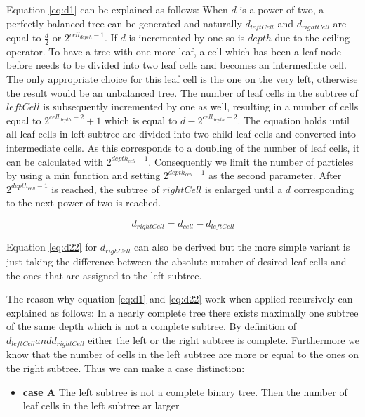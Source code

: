 \documentclass[]{article}
\begin{document}
Equation \ref{eq:d1} can be explained as follows: When $d$ is a power of two, a perfectly balanced tree can be generated and naturally $d_{leftCell}$ and $d_{rightCell}$ are equal to $\frac{d}{2}$ or $2^{cell_{depth} - 1}$. If $d$ is incremented by one so is $depth$ due to the ceiling operator. To have a tree with one more leaf, a cell which has been a leaf node before needs to be divided into two leaf cells and becomes an intermediate cell. The only appropriate choice for this leaf cell is the one on the very left, otherwise the result would be an unbalanced tree.
The number of leaf cells in the subtree of $leftCell$ is subsequently incremented by one as well, resulting in a number of cells equal to $2^{cell_{depth} - 2} + 1$ which is equal to $d - 2^{cell_{depth} - 2}$. The equation holds until all leaf cells in left subtree are divided into two child leaf cells and converted into intermediate cells. As this corresponds to a doubling of the number of leaf cells, it can be calculated with $2^{depth_{cell} - 1}$. Consequently we limit the number of particles by using a min function and setting $2^{depth_{cell} - 1}$ as the second parameter. After $2^{depth_{cell} - 1}$ is reached, the subtree of $rightCell$ is enlarged until a $d$ corresponding to the next power of two is reached. 

\begin{center}
	\begin{equation}  \label{eq:d22}
		d_{rightCell} = d_{cell} - d_{leftCell}
	\end{equation}
\end{center}

Equation \ref{eq:d22} for $d_{righCell}$ can also be derived but the more simple variant is just taking the difference between the absolute number of desired leaf cells and the ones that are assigned to the left subtree. 

The reason why equation \ref{eq:d1} and \ref{eq:d22} work when applied recursively can explained as follows: In a nearly complete tree there exists maximally one subtree of the same depth which is not a complete subtree. By definition of $d_{leftCell} and d_{rightCell}$ either the left or the right subtree is complete. Furthermore we know that the number of cells in the left subtree are more or equal to the ones on the right subtree. Thus we can make a case distinction:

\begin{itemize}
	\item \textbf{case A} The left subtree is not a complete binary tree. Then the number of leaf cells in the left subtree ar larger 
\end{itemize}
\end{document}
